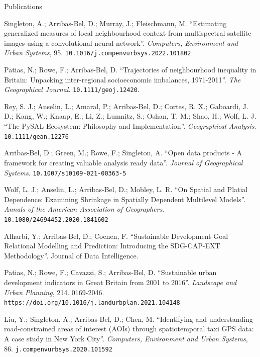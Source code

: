 \documentclass[12pt,2up]{article}
\begin{document}
\begin{cv}{}
\begin{cvlist}{Publications}
\item[] Singleton, A.; Arribas-Bel, D.; Murray, J.; Fleischmann,
        M.
        ``Estimating generalized measures of local neighbourhood context from
        multispectral satellite images using a convolutional neural network''.
        \emph{Computers, Environment and Urban Systems}, 95.
        \texttt{10.1016/j.compenvurbsys.2022.101802}.
\item[\textit{2021}]
        Patias, N.; Rowe, F.; Arribas-Bel, D.
        ``Trajectories of neighbourhood inequality in Britain: Unpacking
        inter-regional socioeconomic imbalances, 1971-2011''.
        \emph{The Geographical Journal}. \texttt{10.1111/geoj.12420}.
\item[]
        Rey, S. J.; Anselin, L.; Amaral, P.; Arribas-Bel, D.; Cortes, R. X.;
        Gaboardi, J. D.; Kang, W.; Knaap, E.; Li, Z.; Lumnitz, S.; Oshan, T.
        M.; Shao, H.; Wolf, L. J.
        ``The PySAL Ecosystem: Philosophy and Implementation''.
        \emph{Geographical Analysis}.
        \texttt{10.1111/gean.12276}
\item[]
        Arribas-Bel, D.; Green, M.; Rowe, F.; Singleton, A.
        ``Open data products - A framework for creating valuable analysis
        ready data''.
        \emph{Journal of Geographical Systems}.
        \texttt{10.1007/s10109-021-00363-5}
\item[]
        Wolf, L. J.; Anselin, L.; Arribas-Bel, D.; Mobley, L. R.
        ``On Spatial and Platial Dependence: Examining Shrinkage in Spatially
        Dependent Multilevel Models''.
        \emph{Annals of the American Association of Geographers}.
        \texttt{10.1080/24694452.2020.1841602}
\item[]
    Alharbi, Y.; Arribas-Bel, D.; Coenen, F. ``Sustainable Development Goal
    Relational Modelling and Prediction: Introducing the SDG-CAP-EXT
    Methodology''. Journal of Data Intelligence.
\item[]
    Patias, N.; Rowe, F.; Cavazzi, S.; Arribas-Bel, D.
    ``Sustainable urban development indicators in Great Britain from 2001 to
    2016''.
    \emph{Landscape and Urban Planning}, 214. 0169-2046.
    \texttt{https://doi.org/10.1016/j.landurbplan.2021.104148}
\item[]
    Liu, Y.; Singleton, A.; Arribas-Bel, D.; Chen, M.
    ``Identifying and understanding road-constrained areas of interest (AOIs)
    through spatiotemporal taxi GPS data: A case study in New York City''.
    \emph{Computers, Environment and Urban Systems}, 86.
        \texttt{j.compenvurbsys.2020.101592}

\end{cvlist}
\end{cv}
\end{document}
